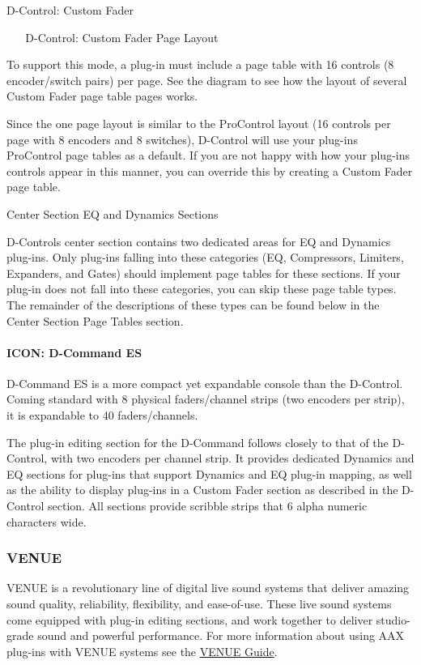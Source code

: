 \begin{DoxyItemize}
  D-\/\+Control\+: Custom Fader 

~ ~   D-\/\+Control\+: Custom Fader Page Layout  

To support this mode, a plug-\/in must include a page table with 16 controls (8 encoder/switch pairs) per page. See the diagram to see how the layout of several Custom Fader page table pages works.

Since the one page layout is similar to the Pro\+Control layout (16 controls per page with 8 encoders and 8 switches), D-\/\+Control will use your plug-\/in\textquotesingle{}s Pro\+Control page tables as a default. If you are not happy with how your plug-\/ins controls appear in this manner, you can override this by creating a Custom Fader page table.


\item Center Section E\+Q and Dynamics Sections

D-\/\+Control\textquotesingle{}s center section contains two dedicated areas for E\+Q and Dynamics plug-\/ins. Only plug-\/ins falling into these categories (E\+Q, Compressors, Limiters, Expanders, and Gates) should implement page tables for these sections. If your plug-\/in does not fall into these categories, you can skip these page table types. The remainder of the descriptions of these types can be found below in the Center Section Page Tables section.  
\end{DoxyItemize}

\hypertarget{a00363_subsubsection__icon_dcommand_es_}{}\paragraph{I\+C\+O\+N\+: D-\/\+Command E\+S}\label{a00363_subsubsection__icon_dcommand_es_}
 D-\/\+Command E\+S is a more compact yet expandable console than the D-\/\+Control. Coming standard with 8 physical faders/channel strips (two encoders per strip), it is expandable to 40 faders/channels.

The plug-\/in editing section for the D-\/\+Command follows closely to that of the D-\/\+Control, with two encoders per channel strip. It provides dedicated Dynamics and E\+Q sections for plug-\/ins that support Dynamics and E\+Q plug-\/in mapping, as well as the ability to display plug-\/ins in a Custom Fader section as described in the D-\/\+Control section. All sections provide scribble strips that 6 alpha numeric characters wide.

\hypertarget{a00363_subsection__venue}{}\subsubsection{V\+E\+N\+U\+E}\label{a00363_subsection__venue}
V\+E\+N\+U\+E is a revolutionary line of digital live sound systems that deliver amazing sound quality, reliability, flexibility, and ease-\/of-\/use. These live sound systems come equipped with plug-\/in editing sections, and work together to deliver studio-\/grade sound and powerful performance. For more information about using A\+A\+X plug-\/ins with V\+E\+N\+U\+E systems see the \hyperlink{a00377}{V\+E\+N\+U\+E Guide}.


